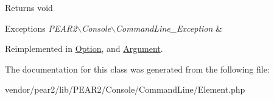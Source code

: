 \begin{DoxyReturn}{\-Returns}
void 
\end{DoxyReturn}

\begin{DoxyExceptions}{\-Exceptions}
{\em \-P\-E\-A\-R2$\backslash$\-Console$\backslash$\-Command\-Line\-\_\-\-Exception} & \\
\hline
\end{DoxyExceptions}


\-Reimplemented in \hyperlink{class_p_e_a_r2_1_1_console_1_1_command_line_1_1_option_a184909dab34698899937d810a9f5d393}{\-Option}, and \hyperlink{class_p_e_a_r2_1_1_console_1_1_command_line_1_1_argument_a184909dab34698899937d810a9f5d393}{\-Argument}.



\-The documentation for this class was generated from the following file\-:\begin{DoxyCompactItemize}
\item 
vendor/pear2/lib/\-P\-E\-A\-R2/\-Console/\-Command\-Line/\-Element.\-php\end{DoxyCompactItemize}
